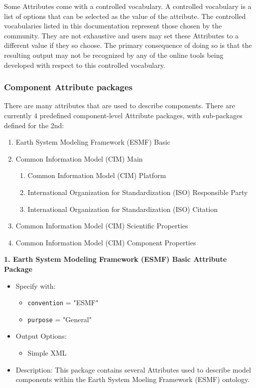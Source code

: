 Some Attributes come with a controlled vocabulary. A controlled vocabulary is a list of options that can be selected as the value of the attribute. The controlled vocabularies listed in this documentation represent those chosen by the community. They are not exhaustive and users may set these Attributes to a different value if they so choose. The primary consequence of doing so is that the resulting output may not be recognized by any of the online tools being developed with respect to this controlled vocabulary.  


\subsubsection{Component Attribute packages}
\label{ComponentAttributePackages}

There are many attributes that are used to describe components. There are currently 4 predefined component-level Attribute packages, with sub-packages defined for the 2nd:

\begin{enumerate}
    \item Earth System Modeling Framework (ESMF) Basic
    \item Common Information Model (CIM) Main
    \begin{enumerate}
        \item Common Information Model (CIM) Platform
        \item International Organization for Standardization (ISO) Responsible Party
        \item International Organization for Standardization (ISO) Citation
    \end{enumerate}
    \item Common Information Model (CIM) Scientific Properties
    \item Common Information Model (CIM) Component Properties
\end{enumerate}

\vspace{.20in}

{\bf 1. Earth System Modeling Framework (ESMF) Basic Attribute Package}

\begin{itemize}
    \item Specify with:
    \begin{itemize}
        \item {\tt convention} = "ESMF"
        \item {\tt purpose} = "General"
    \end{itemize}
    \item Output Options:
    \begin{itemize}
        \item Simple XML
    \end{itemize} 
    \item Description: This package contains several Attributes used to describe model components within the Earth System Moeling Framework (ESMF) ontology. 
\end{itemize}


